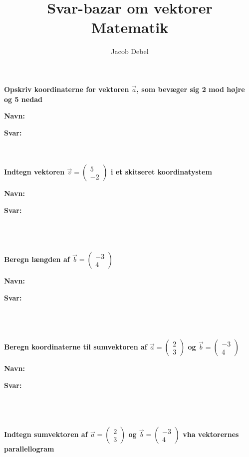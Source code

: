 \documentclass[a4paper, 12pt]{article}
\author{Jacob Debel}
\date{}
\title{Svar-bazar om vektorer\\\medskip
\large Matematik}
\begin{document}
\maketitle
\textbf{Opskriv koordinaterne for vektoren \(\vec{a}\), som bevæger sig 2 mod højre og 5 nedad}


\textbf{Navn:}

\textbf{Svar:}

$\phantom{a}$\\
$\phantom{a}$\\

\textbf{Indtegn vektoren \(\vec{v} = \begin{pmatrix} 5 \\ -2 \end{pmatrix}\) i et skitseret koordinatystem}

\textbf{Navn:}

\textbf{Svar:}

$\phantom{a}$\\
$\phantom{a}$\\
$\phantom{a}$\\

\textbf{Beregn længden af \(\vec{b} = \begin{pmatrix}-3\\4 \end{pmatrix}\)}

\textbf{Navn:}

\textbf{Svar:}

$\phantom{a}$\\
$\phantom{a}$\\
$\phantom{a}$\\

\textbf{Beregn koordinaterne til sumvektoren af \(\vec{a}= \begin{pmatrix} 2\\3 \end{pmatrix}\) og \(\vec{b}=\begin{pmatrix} -3 \\ 4 \end{pmatrix}\)}

\textbf{Navn:}

\textbf{Svar:}

$\phantom{a}$\\
$\phantom{a}$\\
$\phantom{a}$\\

\textbf{Indtegn sumvektoren af \(\vec{a}= \begin{pmatrix} 2\\3 \end{pmatrix}\) og \(\vec{b}=\begin{pmatrix} -3 \\ 4 \end{pmatrix}\) vha vektorernes parallellogram}
\end{document}

